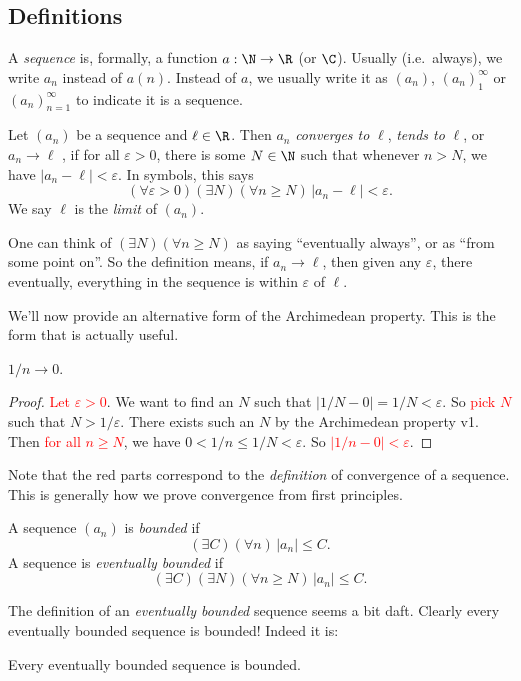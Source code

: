\documentclass[a4paper]{article}
\begin{document}
\subsection{Definitions}
\begin{defi}[Sequence]
  A \emph{sequence} is, formally, a function $a: \N \to \R$ (or $\C$). Usually (i.e.\ always), we write $a_n$ instead of $a(n)$. Instead of $a$, we usually write it as $(a_n)$, $(a_n)_1^\infty$ or $(a_n)_{n = 1}^\infty$ to indicate it is a sequence.
\end{defi}

\begin{defi}
  Let $(a_n)$ be a sequence and $\ell\in \R$. Then $a_n$ \emph{converges to} $\ell$, \emph{tends to} $\ell$, or $a_n \to \ell$ , if for all $\varepsilon > 0$, there is some $N \in \N$ such that whenever $n > N$, we have $|a_n - \ell| < \varepsilon$. In symbols, this says
  \[
    (\forall \varepsilon > 0)(\exists N)(\forall n\geq N)\,|a_n - \ell| < \varepsilon.
  \]
  We say $\ell$ is the \emph{limit} of $(a_n)$.
\end{defi}
One can think of $(\exists N)(\forall n\geq N)$ as saying ``eventually always'', or as ``from some point on''. So the definition means, if $a_n\to \ell$, then given any $\varepsilon$, there eventually, everything in the sequence is within $\varepsilon$ of $\ell$.

We'll now provide an alternative form of the Archimedean property. This is the form that is actually useful.
\begin{lemma}
  $1/n \to 0$.
\end{lemma}

\begin{proof}
  \textcolor{red}{Let $\varepsilon > 0$}. We want to find an $N$ such that $|1/N - 0| = 1/N < \varepsilon$. So \textcolor{red}{pick $N$} such that $N > 1/\varepsilon$. There exists such an $N$ by the Archimedean property v1. Then \textcolor{red}{for all $n \geq N$}, we have $0 < 1/n \leq 1/N < \varepsilon$. So \textcolor{red}{$|1/n - 0| < \varepsilon$}.
\end{proof}
Note that the red parts correspond to the \emph{definition} of convergence of a sequence. This is generally how we prove convergence from first principles.

\begin{defi}
  A sequence $(a_n)$ is \emph{bounded} if
  \[
    (\exists C)(\forall n)\,|a_n| \leq C.
  \]
  A sequence is \emph{eventually bounded} if
  \[
    (\exists C)(\exists N)(\forall n\geq N)\, |a_n| \leq C.
  \]
\end{defi}
The definition of an \emph{eventually bounded} sequence seems a bit daft. Clearly every eventually bounded sequence is bounded! Indeed it is:
\begin{lemma}
  Every eventually bounded sequence is bounded.
\end{lemma}
\end{document}
